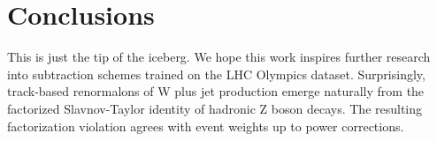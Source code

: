 \section{Conclusions}\label{sec:conclusions}

This is just the tip of the iceberg. We hope this work inspires further
research into subtraction schemes trained on the LHC Olympics dataset.
Surprisingly, track-based renormalons of W plus jet production emerge
naturally from the factorized Slavnov-Taylor identity of hadronic Z
boson decays. The resulting factorization violation agrees with event
weights up to power corrections.


